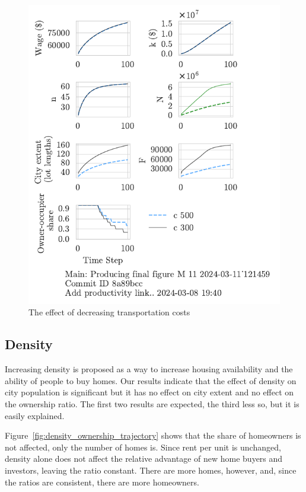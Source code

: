 \begin{figure}[h!t]
    \centering
    \includegraphics[scale=1, trim={0 1.4cm 0 0},clip]{fig/c-Main-121459.pdf}
    \caption{The effect of decreasing transportation costs}
    \label{fig:c_ownership_trajectory}
\end{figure}

\newpage
\subsection{Density}
Increasing density is proposed as a way to increase housing availability and the ability of people to buy homes. Our results indicate that the effect of density on city population is significant but it has no effect on city extent and no effect on the ownership ratio. The first two results are expected, the third less so, but it is easily explained. 

Figure~\ref{fig:density_ownership_trajectory} shows that the share of homeowners is not affected, only the number of homes is. Since rent per unit is unchanged, density alone does not affect the relative advantage of new home buyers and investors, leaving the ratio constant. There are more homes, however, and, since the ratios are consistent, there are more homeowners. 


